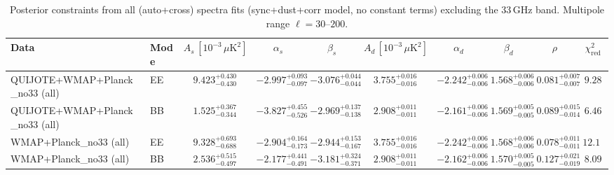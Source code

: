\begin{table}[h]
\centering
\scriptsize
\setlength{\tabcolsep}{4pt}
\caption{Posterior constraints from all (auto+cross) spectra fits (sync+dust+corr model, no constant terms) excluding the 33\,GHz band. Multipole range $\ell=30$--$200$.}
\label{tab:fit_results_all_no33_sync_dust_cross}
\begin{tabular}{llcccccccc}
\toprule
Data & Mode & $A_s\,[10^{-3}\,\mu\mathrm{K}^2]$ & $\alpha_s$ & $\beta_s$ & $A_d\,[10^{-3}\,\mu\mathrm{K}^2]$ & $\alpha_d$ & $\beta_d$ & $\rho$ & $\chi^2_\mathrm{red}$ \\
\midrule
QUIJOTE+WMAP+Planck\_no33 (all) & EE & $9.423^{+0.430}_{-0.430}$ & $-2.997^{+0.093}_{-0.097}$ & $-3.076^{+0.044}_{-0.044}$ & $3.755^{+0.016}_{-0.016}$ & $-2.242^{+0.006}_{-0.006}$ & $1.568^{+0.006}_{-0.006}$ & $0.081^{+0.007}_{-0.007}$ & $9.28$ \\
QUIJOTE+WMAP+Planck\_no33 (all) & BB & $1.525^{+0.367}_{-0.344}$ & $-3.827^{+0.455}_{-0.526}$ & $-2.969^{+0.137}_{-0.138}$ & $2.908^{+0.011}_{-0.011}$ & $-2.161^{+0.006}_{-0.006}$ & $1.569^{+0.005}_{-0.005}$ & $0.089^{+0.015}_{-0.014}$ & $6.46$ \\
WMAP+Planck\_no33 (all) & EE & $9.328^{+0.693}_{-0.688}$ & $-2.904^{+0.164}_{-0.173}$ & $-2.944^{+0.153}_{-0.167}$ & $3.755^{+0.016}_{-0.016}$ & $-2.242^{+0.006}_{-0.006}$ & $1.568^{+0.006}_{-0.006}$ & $0.078^{+0.011}_{-0.011}$ & $12.12$ \\
WMAP+Planck\_no33 (all) & BB & $2.536^{+0.515}_{-0.497}$ & $-2.177^{+0.441}_{-0.491}$ & $-3.181^{+0.324}_{-0.371}$ & $2.908^{+0.011}_{-0.011}$ & $-2.162^{+0.006}_{-0.006}$ & $1.570^{+0.005}_{-0.005}$ & $0.127^{+0.021}_{-0.019}$ & $8.09$ \\
\bottomrule
\end{tabular}
\end{table}
